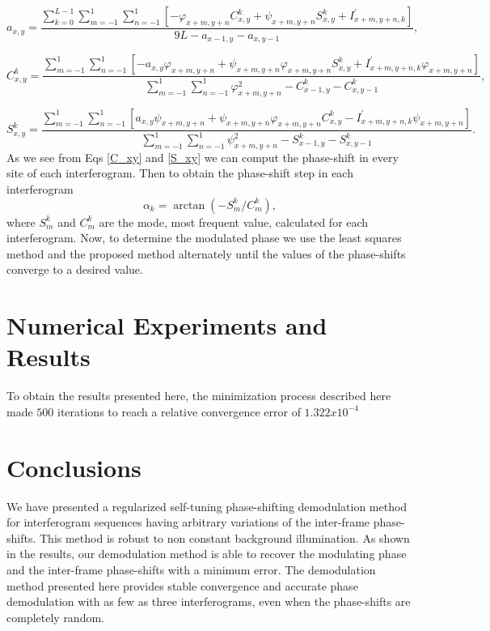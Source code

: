 \documentclass[letterpaper,12pt]{article}   %
\begin{document}
\begin{equation}
a_{x,y} = \frac{ \sum_{k=0}^{L-1} \sum_{m=-1}^{1} \sum_{n=-1}^{1} \left[ -\varphi_{x+m,y+n}C_{x,y}^k+\psi_{x+m,y+n}S_{x,y}^k+I_{x+m,y+n,k}^{'} \right] } { 9L - a_{x-1,y}-a_{x,y-1}},
\end{equation}

\begin{equation}\label{C_xy}
C_{x,y}^k = \frac{ \sum_{m=-1}^{1} \sum_{n=-1}^{1} \left[ -a_{x,y} \varphi_{x+m,y+n}+ \psi_{x+m,y+n} \varphi_{x+m,y+n} S_{x,y}^k + I_{x+m,y+n,k}^{'} \varphi_{x+m,y+n} \right] } { \sum_{m=-1}^{1} \sum_{n=-1}^{1} \varphi_{x+m,y+n}^2 -C_{x-1,y}^k-C_{x,y-1}^k },
\end{equation}

\begin{equation}\label{S_xy}
S_{x,y}^k = \frac{ \sum_{m=-1}^{1} \sum_{n=-1}^{1} \left[ a_{x,y} \psi_{x+m,y+n} + \psi_{x+m,y+n} \varphi_{x+m,y+n} C_{x,y}^k - I_{x+m,y+n,k}^{'} \psi_{x+m,y+n} \right] } { \sum_{m=-1}^{1} \sum_{n=-1}^{1} \psi_{x+m,y+n}^2 - S_{x-1,y}^k - S_{x,y-1}^k }.
\end{equation}
As we see from Eqs \ref{C_xy} and \ref{S_xy} we can comput the phase-shift in every site of each interferogram. Then to obtain the phase-shift step in each interferogram
\begin{equation}
\alpha_k = \arctan(-S_m^k/C_m^k),
\end{equation}
where $S_m^k$ and $C_m^k$ are the mode, most frequent value, calculated for each interferogram.
Now, to determine the modulated phase we use the least squares method and the proposed method alternately until the values ​​of the phase-shifts converge to a desired value.

\section{Numerical Experiments and Results}
To obtain the results presented here, the minimization process described here made $500$ iterations to reach a relative convergence error of $1.322x10^{-4}$

\section{Conclusions}
We have presented a regularized self-tuning phase-shifting demodulation method for interferogram sequences having arbitrary variations of the inter-frame phase-shifts. This method is robust to non constant background illumination. As shown in the results, our demodulation method is able to recover the modulating phase and the inter-frame phase-shifts with a minimum error. The demodulation method presented here provides stable convergence and accurate phase demodulation with as few as three interferograms, even when the phase-shifts are completely random.




\end{document}
